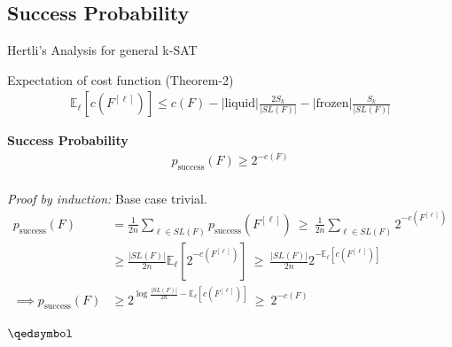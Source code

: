 \documentclass[
	xcolor={svgnames},
	hyperref={pagebackref,bookmarks},
	aspectratio=43,
]{beamer}
\begin{document}
\subsection{Success Probability}
\begin{frame}{Hertli's Analysis for general k-SAT}
	\begin{block}{Expectation of cost function (Theorem-2)}
		\vspace{-5mm}
		\begin{align}
			\mathbb{E}_\ell[c(F^{[\ell]})] \leq c(F) - |\text{liquid}|\frac{2 S_k}{|SL(F)|} - |\text{frozen}|\frac{S_k}{|SL(F)|}
		\end{align}
	\end{block}
	\begin{block}{\textbf{Success Probability}}
		\vspace{-6.5mm}
		\begin{align}
			p_{\text{success}}(F) \geq 2^{-c(F)}
		\end{align}
		\, \\ \vspace*{-5mm}
		\textit{Proof by induction:} Base case trivial. \vspace{-2mm}
		\begin{align*}
			p_{\text{success}}(F) &= \frac{1}{2 n} \sum_{\ell \in SL(F)} p_{\text{success}}(F^{[\ell]})\ \geq \ \frac{1}{2 n} \sum_{\ell \in SL(F)} 2^{-c(F^{[\ell]})} \\
			&\geq \frac{|SL(F)|}{2n}\mathbb{E}_\ell[2^{-c(F^{[\ell]})}] \ \geq\ \frac{|SL(F)|}{2n}2^{-\mathbb{E}_\ell[c(F^ {[\ell]})]} \\
			\implies p_{\text{success}}(F) &\geq 2^{\log \frac{|SL(F)|}{2n} - \mathbb{E}_\ell[c(F^ {[\ell]})]} \ \geq \ 2^{-c(F)}
		\end{align*}
		\vspace{-15mm}
		\begin{flushright}
			$\qedsymbol$
		\end{flushright}
	\end{block}
\end{frame}
\end{document}
